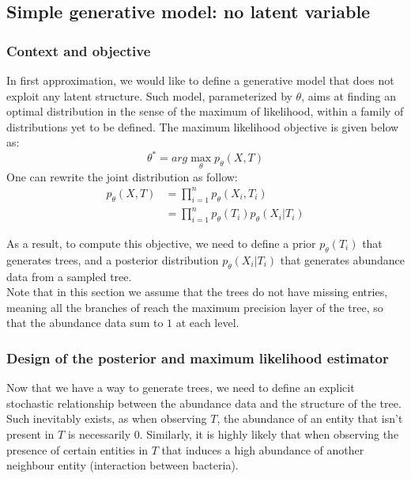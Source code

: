 \subsection{Simple generative model: no latent variable}

\subsubsection{Context and objective}

In first approximation, we would like to define a generative model that does not exploit any latent structure.
Such model, parameterized by $\theta$, aims at finding an optimal distribution in the sense of the maximum of likelihood,
within a family of distributions yet to be defined.
The maximum likelihood objective is given below as:
$$
\theta^* = arg\max_{\theta} p_{\theta}(X, T)
$$
One can rewrite the joint distribution as follow:
$$
\begin{align}
    p_{\theta}(X, T) &= \prod_{i=1}^n p_{\theta}(X_i, T_i) \\
                    &= \prod_{i=1}^n p_{\theta}(T_i) p_{\theta}(X_i | T_i)
\end{align}
$$

As a result, to compute this objective, we need to define a prior $p_{\theta}(T_i)$ that generates trees,
and a posterior distribution $p_{\theta}(X_i | T_i)$ that generates abundance data from a sampled tree. \\

Note that in this section we assume that the trees do not have missing entries, meaning all the branches of
reach the maximum precision layer of the tree, so that the abundance data sum to $1$ at each level.



\subsubsection{Design of the posterior and maximum likelihood estimator}


Now that we have a way to generate trees, we need to define an explicit stochastic relationship between the abundance
data and the structure of the tree.
Such inevitably exists, as when observing $T$, the abundance of an entity that isn't present in $T$ is necessarily 0.
Similarly, it is highly likely that when observing the presence of certain entities in $T$ that induces a high abundance of
another neighbour entity (interaction between bacteria). \\

